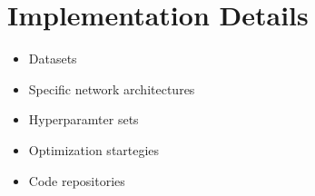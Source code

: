 \chapter{Implementation Details}
\begin{itemize}
    \item Datasets
    \item Specific network architectures
    \item Hyperparamter sets
    \item Optimization startegies
    \item Code repositories
\end{itemize}